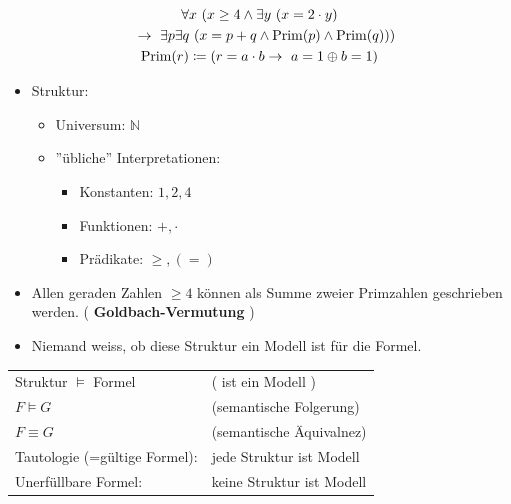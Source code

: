\begin{bsp*}
	\begin{gather*}
		\forall x~( x \geq 4 \wedge \exists y~( x = 2 \cdot y ) \\
		\quad \rightarrow \exists p \exists q~( x = p + q \wedge \Prim( p ) \wedge \Prim( q ) ) ) \\
		\Prim( r ) \coloneqq ( r = a \cdot b \rightarrow a = 1 \oplus b = 1 )
	\end{gather*}
	\begin{itemize}
		\item Struktur:
		\begin{itemize}
			\item Universum: $\mathbb{N}$
			\item ''übliche'' Interpretationen:
			\begin{itemize}
				\item Konstanten: $1 , 2 , 4$
				\item Funktionen: $+ , \cdot$
				\item Prädikate: $\geq , ( = )$
			\end{itemize}
		\end{itemize}
		\item Allen geraden Zahlen $\geq 4$ können als Summe zweier Primzahlen geschrieben werden. ( \textbf{Goldbach-Vermutung} )
		\item Niemand weiss, ob diese Struktur ein Modell ist für die Formel.
	\end{itemize}
\end{bsp*}
\begin{bem}
	\begin{tabular}{ l l }
		Struktur $\models$ Formel		& ( ist ein Modell )		\\
		$F \models G$				& (semantische Folgerung)	\\
		$F \equiv G$				& (semantische Äquivalnez)	\\
		Tautologie (=gültige Formel):	& jede Struktur ist Modell	\\
		Unerfüllbare Formel:			& keine Struktur ist Modell	
	\end{tabular}
\end{bem}
